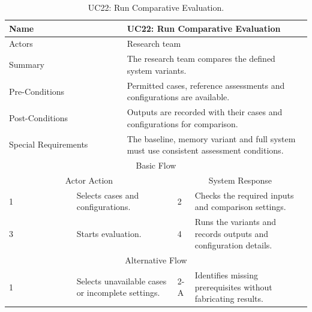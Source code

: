 \begin{table}[htbp]
\centering
\small
\caption{UC22: Run Comparative Evaluation.}
\label{tab:kashaf:uc22}
\begin{tabular}{|p{}|p{}|p{}|p{}|p{}|}
\hline
\multicolumn{2}{|p{\dimexpr0.225\textwidth+2\tabcolsep+\arrayrulewidth\relax}|}{Name} & \multicolumn{3}{p{\dimexpr0.575\textwidth+4\tabcolsep+2\arrayrulewidth\relax}|}{UC22: Run Comparative Evaluation} \\ \hline
\multicolumn{2}{|p{\dimexpr0.225\textwidth+2\tabcolsep+\arrayrulewidth\relax}|}{Actors} & \multicolumn{3}{p{\dimexpr0.575\textwidth+4\tabcolsep+2\arrayrulewidth\relax}|}{Research team} \\ \hline
\multicolumn{2}{|p{\dimexpr0.225\textwidth+2\tabcolsep+\arrayrulewidth\relax}|}{Summary} & \multicolumn{3}{p{\dimexpr0.575\textwidth+4\tabcolsep+2\arrayrulewidth\relax}|}{The research team compares the defined system variants.} \\ \hline
\multicolumn{2}{|p{\dimexpr0.225\textwidth+2\tabcolsep+\arrayrulewidth\relax}|}{Pre-Conditions} & \multicolumn{3}{p{\dimexpr0.575\textwidth+4\tabcolsep+2\arrayrulewidth\relax}|}{Permitted cases, reference assessments and configurations are available.} \\ \hline
\multicolumn{2}{|p{\dimexpr0.225\textwidth+2\tabcolsep+\arrayrulewidth\relax}|}{Post-Conditions} & \multicolumn{3}{p{\dimexpr0.575\textwidth+4\tabcolsep+2\arrayrulewidth\relax}|}{Outputs are recorded with their cases and configurations for comparison.} \\ \hline
\multicolumn{2}{|p{\dimexpr0.225\textwidth+2\tabcolsep+\arrayrulewidth\relax}|}{Special Requirements} & \multicolumn{3}{p{\dimexpr0.575\textwidth+4\tabcolsep+2\arrayrulewidth\relax}|}{The baseline, memory variant and full system must use consistent assessment conditions.} \\ \hline
\multicolumn{5}{|c|}{Basic Flow} \\ \hline
\multicolumn{3}{|c|}{Actor Action} & \multicolumn{2}{c|}{System Response} \\ \hline
1 & \multicolumn{2}{p{\dimexpr0.37\textwidth+2\tabcolsep+\arrayrulewidth\relax}|}{Selects cases and configurations.} & 2 & Checks the required inputs and comparison settings. \\ \hline
3 & \multicolumn{2}{p{\dimexpr0.37\textwidth+2\tabcolsep+\arrayrulewidth\relax}|}{Starts evaluation.} & 4 & Runs the variants and records outputs and configuration details. \\ \hline
\multicolumn{5}{|c|}{Alternative Flow} \\ \hline
1 & \multicolumn{2}{p{\dimexpr0.37\textwidth+2\tabcolsep+\arrayrulewidth\relax}|}{Selects unavailable cases or incomplete settings.} & 2-A & Identifies missing prerequisites without fabricating results. \\ \hline
\end{tabular}
\end{table}

